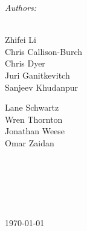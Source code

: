 \begin{titlepage}
\begin{center}
\emph{Authors:}\\
\ \\
\begin{minipage}{0.4\textwidth}
%
\begin{flushleft} \large
Zhifei Li\\
Chris Callison-Burch\\
Chris Dyer\\
Juri Ganitkevitch\\
Sanjeev Khudanpur
\end{flushleft}
\end{minipage}
%
\begin{minipage}{0.4\textwidth}
\begin{flushright} \large
Lane Schwartz\\
Wren Thornton\\
Jonathan Weese\\
Omar Zaidan
\end{flushright}
\end{minipage}
%
\ \\ %
\ \\ %
\ \\ %
\ \\ %
\ \\ %
%
%
\vfill %
%
{\large \today}
%
\end{center}
\end{titlepage}
